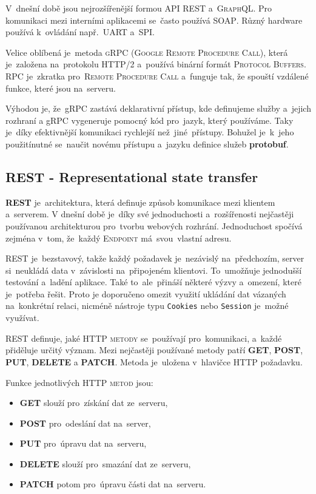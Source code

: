 \documentclass[14pt,a4paper]{article}
\begin{document}
        V~dnešní době jsou nejrozšířenější formou API \textsc{REST} a~\textsc{GraphQL}. Pro komunikaci mezi interními aplikacemi se~často používá \textsc{SOAP}. Různý hardware používá k~ovládání např.~\textsc{UART} a~\textsc{SPI}.

        Velice oblíbená je~metoda \textsc{gRPC} (\textsc{Google Remote Procedure Call}), která je~založena na~protokolu HTTP/2 a~používá binární formát \textsc{Protocol Buffers}. \textsc{RPC} je~zkratka pro~\textsc{Remote Procedure Call} a~funguje tak, že spouští vzdálené funkce, které jsou na~serveru.
        
        Výhodou je, že~gRPC zastává deklarativní přístup, kde definujeme služby a~jejich rozhraní a gRPC vygeneruje pomocný kód pro~jazyk, který používáme. Taky je~díky efektivnější komunikaci rychlejší než~jiné~přístupy. Bohužel je~k~jeho použitínutné se~naučit novému přístupu a~jazyku definice služeb \textbf{protobuf}. \parencite{thenewstackBuildRealWorld}

        \subsection{REST - Representational state transfer}
        \textbf{REST} je~architektura, která definuje způsob komunikace mezi klientem a~serverem. V dnešní době je~díky své jednoduchosti a~rozšířenosti nejčastěji používanou architekturou pro~tvorbu webových rozhrání. Jednoduchost spočívá zejména v~tom, že~každý \textsc{Endpoint} má~svou~vlastní adresu.
        
        \textsc{REST} je~bezstavový, takže každý požadavek je~nezávislý na~předchozím, server si~neukládá data v~závislosti na~připojeném klientovi. To~umožňuje jednodušší testování a~ladění aplikace. Také to~ale~přináší některé výzvy a~omezení, které je~potřeba řešit. Proto je doporučeno omezit využití ukládání dat vázaných na~konkrétní relaci, nicméně nástroje typu \texttt{Cookies} nebo \texttt{Session} je~možné využívat.
        
        \textsc{REST} definuje, jaké \textsc{HTTP metody} se~používají pro~komunikaci, a~každé přiděluje určitý význam. Mezi nejčastěji používané metody patří \textbf{GET}, \textbf{POST}, \textbf{PUT}, \textbf{DELETE} a \textbf{PATCH}. Metoda je~uložena v~hlavičce HTTP požadavku.

        Funkce jednotlivých \textsc{HTTP metod} jsou:
        \begin{itemize}
            \item \textbf{GET} slouží pro~získání dat ze~serveru,
            \item \textbf{POST} pro~odeslání dat na~server,
            \item \textbf{PUT} pro~úpravu dat na~serveru,
            \item \textbf{DELETE} slouží pro~smazání dat ze~serveru,
            \item \textbf{PATCH} potom pro~úpravu části dat na~serveru.
        \end{itemize}
\end{document}
